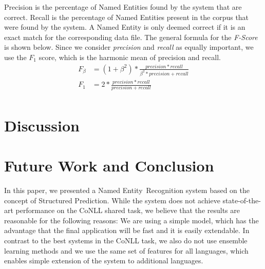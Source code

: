 \documentclass[11pt]{article}
\newcommand{\namedentity}{Named Entity}
\begin{document}
Precision is the percentage of Named Entities found by the system that are correct. Recall is the percentage of Named Entities present in the corpus that were found by the system. A Named Entity is only deemed correct if it is an exact match for the corresponding data file. The general formula for the \emph{F-Score} is shown below. Since we consider \emph{precision} and \emph{recall} as equally important, we use the $F_{1}$ score, which is the harmonic mean of precision and recall.
\begin{align*}
  F_{\beta} &=  (1+\beta^2)*\frac{precision *recall}{\beta^2* precision + recall}\\
  F_1       &= 2*\frac{precision *recall}{precision + recall}\\
\end{align*}





\section{Discussion}


\section{Future Work and Conclusion}

In this paper, we presented a \namedentity~Recognition system based on the concept of Structured Prediction. While the system does not achieve state-of-the-art performance on the CoNLL shared task, we believe that the results are reasonable for the following reasons: We are using a simple model, which has the advantage that the final application will be fast and it is easily extendable. In contrast to the best systems in the CoNLL task, we also do not use ensemble learning methods and we use the same set of features for all languages, which enables simple extension of the system to additional languages.




\end{document}
